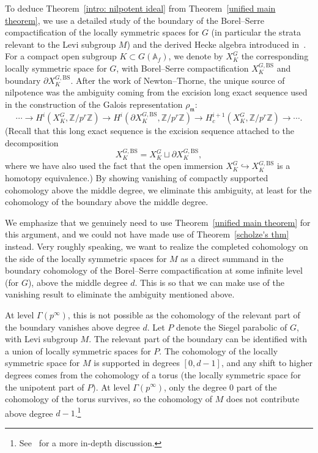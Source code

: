 \documentclass{amsart}
\theoremstyle{remark}
\numberwithin{equation}{subsection}
\newcommand{\A}{\AA}
\newcommand{\Z}{\ZZ}
\newcommand{\m}{\frakm}
\renewcommand{\AA}{{\mathbb A}}
\newcommand{\ZZ}{{\mathbb Z}}
\newcommand{\frakm}{\mathfrak{m}}
\renewcommand{\(}{\left(}
\renewcommand{\)}{\right)}
\begin{document}
To deduce Theorem~\ref{intro: nilpotent ideal} from Theorem~\ref{unified main theorem}, we use a detailed study of the boundary of the Borel--Serre compactification of the locally symmetric spaces for $G$ (in particular the strata relevant to the Levi subgroup $M$) and the derived Hecke algebra introduced in~\cite{newton-thorne}. For a compact open subgroup $K\subset G(\A_f)$, we denote by $X^G_K$ the corresponding locally symmetric space for $G$, with Borel--Serre compactification $X^{G,\mathrm{BS}}_K$ and boundary $\partial X^{G,\mathrm{BS}}_K$. After the work of Newton--Thorne, the unique source of nilpotence was the ambiguity coming from the excision long exact sequence used in the construction of the Galois representation $\rho_{\m}$:
\[
\dotsb \to H^i(X^G_K,\Z/p^r\Z)\to H^i(\partial X^{G,\mathrm{BS}}_K,\Z/p^r\Z)\to H^{i+1}_c(X^G_K,\Z/p^r\Z)\to \dotsb.
\] 
(Recall that this long exact sequence is the excision sequence attached to the decomposition
\[
X^{G,\mathrm{BS}}_K=X^G_K\sqcup \partial X^{G,\mathrm{BS}}_K,
\] 
where we have also used the fact that the open immersion $X^G_K\hookrightarrow X^{G,\mathrm{BS}}_K$ is a homotopy equivalence.) By showing vanishing of compactly supported cohomology above the middle degree, we eliminate this ambiguity, at least for the cohomology of the boundary above the middle degree. 

We emphasize that we genuinely need to use Theorem~\ref{unified main theorem} for this argument, and we could not have made use of Theorem~\ref{scholze's thm} instead. Very roughly speaking, we want to realize the completed cohomology on the side of the locally symmetric spaces for $M$ as a direct summand in the boundary cohomology of the Borel--Serre compactification at some infinite level (for $G$), above the middle degree $d$. This is so that we can make use of the vanishing result to eliminate the ambiguity mentioned above. 

At level $\Gamma(p^{\infty})$, this is not possible as the cohomology of the relevant part of the boundary vanishes above degree $d$. Let $P$ denote the Siegel parabolic of $G$, with Levi subgroup $M$. The relevant part of the boundary can be identified with a union of locally symmetric spaces for $P$. The cohomology of the locally symmetric space for $M$ is supported in degrees $[0,d-1]$, and any shift to higher degrees comes from the cohomology of a torus (the locally symmetric space for the unipotent part of $P$). At level $\Gamma(p^\infty)$, only the degree $0$ part of the cohomology of the torus survives, so the cohomology of $M$ does not contribute above degree $d-1$.\footnote{See~\cite[\S 1.5]{calegari-emerton} for a more in-depth discussion.} 
\end{document}
